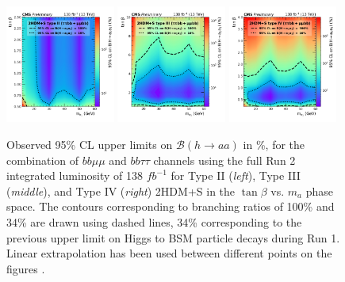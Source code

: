 \begin{figure}[h]
    \begin{center}
      \includegraphics[width=0.32\textwidth]{figures/ch-10-results/HAA_comb_II_prelim.pdf}
      \includegraphics[width=0.32\textwidth]{figures/ch-10-results/HAA_comb_III_prelim.pdf}
      \includegraphics[width=0.32\textwidth]{figures/ch-10-results/HAA_comb_IV_prelim.pdf}
    \end{center}
    \caption[Observed 95\% CL upper limits on $\mathcal{B}(h\to aa)$ in \%, for the combination of $bb\mu\mu$ and $bb\tau\tau$ channels using the full Run 2 integrated luminosity of 138 $fb^{-1}$ for Type II (\textit{left}), Type III (\textit{middle}), and Type IV (\textit{right}) 2HDM+S in the $\tan\beta$ vs. $m_a$ phase space.]{Observed 95\% CL upper limits on $\mathcal{B}(h\to aa)$ in \%, for the combination of $bb\mu\mu$ and $bb\tau\tau$ channels using the full Run 2 integrated luminosity of 138 $fb^{-1}$ for Type II (\textit{left}), Type III (\textit{middle}), and Type IV (\textit{right}) 2HDM+S in the $\tan\beta$ vs. $m_a$ phase space. The contours corresponding to branching ratios of 100\% and 34\% are drawn using dashed lines, 34\% corresponding to the previous upper limit on Higgs to BSM particle decays during Run 1. Linear extrapolation has been used between different points on the figures \cite{CMS-AN-20-213}.}
      \label{fig:results_limits_combined_2D}
  \end{figure}
  
